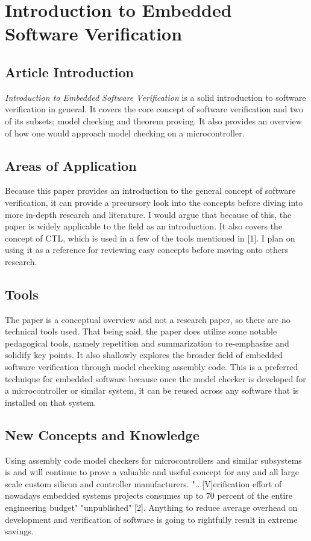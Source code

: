 \documentclass[conference]{IEEEtran}
\begin{document}
\section{Introduction to Embedded Software Verification}

\subsection{Article Introduction}
\emph{Introduction to Embedded Software Verification} is a solid introduction to software verification in general. It covers the core concept of software verification and two of its subsets; model checking and theorem proving. It also provides an overview of how one would approach model checking on a microcontroller.

\subsection{Areas of Application}
Because this paper provides an introduction to the general concept of software verification, it can provide a precursory look into the concepts before diving into more in-depth research and literature. I would argue that because of this, the paper is widely applicable to the field as an introduction. It also covers the concept of CTL, which is used in a few of the tools mentioned in [1]. I plan on using it as a reference for reviewing easy concepts before moving onto others research. 

\subsection{Tools}
The paper is a conceptual overview and not a research paper, so there are no technical tools used. That being said, the paper does utilize some notable pedagogical tools, namely repetition and summarization to re-emphasize and solidify key points. It also shallowly explores the broader field of embedded software verification through model checking assembly code. This is a preferred technique for embedded software because once the model checker is developed for a microcontroller or similar system, it can be reused across any software that is installed on that system.

\subsection{New Concepts and Knowledge}
Using assembly code model checkers for microcontrollers and similar subsystems is and will continue to prove a valuable and useful concept for any and all large scale custom silicon and controller manufacturers. "...[V]erification effort of nowadays embedded systems projects consumes up to 70 percent of the entire engineering budget" "unpublished" [2]. Anything to reduce average overhead on development and verification of software is going to rightfully result in extreme savings.
\end{document}
